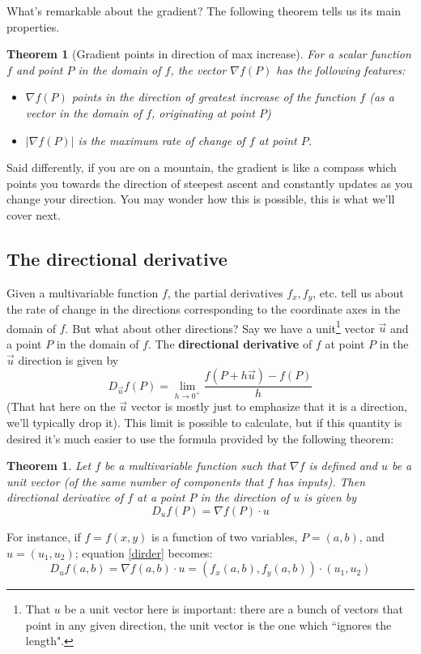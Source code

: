 \documentclass[12pt]{article}
\numberwithin{equation}{subsection}
\numberwithin{figure}{subsection}
\newtheorem{thm}[subsection]{Theorem}
\theoremstyle{note}
\begin{document}
{What's remarkable about the gradient? The following theorem tells us its main properties. 

\begin{thm}[Gradient points in direction of max increase] \label{gradient-properties} For a scalar function $f$ and point $P$ in the domain of $f$, the vector $\nabla f(P)$ has the following features:
\begin{itemize}
\item $\nabla f(P)$ points in the direction of greatest increase of the function $f$ (as a vector in the domain of $f$, originating at point $P$)
\item $| \nabla f (P) |$ is the \textit{maximum rate of change} of $f$ at point $P$. 
\end{itemize}
\end{thm}

Said differently, if you are on a mountain, the gradient is like a compass which points you towards the direction of steepest ascent and constantly updates as you change your direction. You may wonder how this is possible, this is what we'll cover next. 

\subsection{The directional derivative}

Given a multivariable function $f$, the partial derivatives $f_x,f_y$, etc. tell us about the rate of change in the directions corresponding to the coordinate axes in the domain of $f$. But what about other directions? Say we have a unit\footnote{That $u$ be a unit vector here is important: there are a bunch of vectors that point in any given direction, the unit vector is the one which ``ignores the length".} vector $\vec{u}$ and a point $P$ in the domain of $f$. The \textbf{directional derivative} of $f$ at point $P$ in the $\vec{u}$ direction is given by \begin{equation} D_{\vec{u}} f(P)= \lim_{h\to 0^+} \dfrac{f(P+h \vec{u})-f(P)}{h} \end{equation} (That hat here on the $\vec{u}$ vector is mostly just to emphasize that it is a direction, we'll typically drop it). This limit is possible to calculate, but if this quantity is desired it's much easier to use the formula provided by the following theorem:

\begin{thm} Let $f$ be a multivariable function such that $\nabla f$ is defined and $u$ be a unit vector (of the same number of components that $f$ has inputs). Then {directional derivative} of $f$ at a point $P$ in the direction of $u$ is given by \begin{equation} \label{dirder} 
	D_u f(P)=\nabla f (P) \cdot u
\end{equation}
\end{thm}
For instance, if $f=f(x,y)$ is a function of two variables, $P=(a,b)$, and $u=(u_1,u_2)$; equation \eqref{dirder} becomes: \[ D_u f(a,b) = \nabla f(a,b) \cdot u= (f_x (a,b), f_y(a,b)) \cdot (u_1,u_2)\]

}
\end{document}
